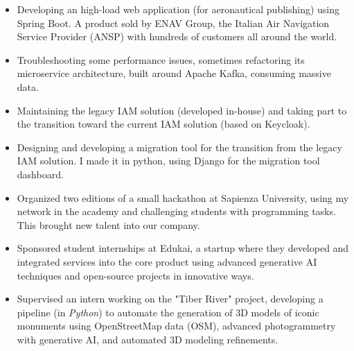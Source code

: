 	\begin{itemize}
		\item Developing an high-load web application (for aeronautical publishing) using Spring Boot. A product sold by ENAV Group, the Italian Air Navigation Service Provider (ANSP) with hundreds of customers all around the world.
		\item Troubleshooting some performance issues, sometimes refactoring its microservice architecture, built around Apache Kafka, consuming massive data.
		\item Maintaining the legacy IAM solution (developed in-house) and taking part to the transition toward the current IAM solution (based on Keycloak).
		\item Designing and developing a migration tool for the transition from the legacy IAM solution. I made it in python, using Django for the migration tool dashboard.
		\item Organized two editions of a small hackathon at Sapienza University, using my network in the academy and challenging students with programming tasks. This brought new talent into our company.
	\end{itemize}
	\smallskip

	\divider

	\begin{itemize}
		\item Sponsored student internships at Edukai, a startup where they developed and integrated services into the core product using advanced generative AI techniques and open-source projects in innovative ways.
		\item Supervised an intern working on the "Tiber River" project, developing a pipeline (in \emph{Python}) to automate the generation of 3D models of iconic monuments using OpenStreetMap data (OSM), advanced photogrammetry with generative AI, and automated 3D modeling refinements. %
	\end{itemize}
	\smallskip

	\medskip

